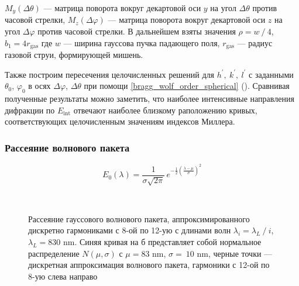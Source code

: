  $M_y(\Delta \theta)$ --- матрица поворота вокруг декартовой оси $y$ на угол $\Delta\theta$ против часовой стрелки, $M_z(\Delta\varphi)$ --- матрица поворота вокруг декартовой оси $z$ на угол $\Delta\varphi$ против часовой стрелки. В дальнейшем взяты значения $\rho = w\:/\:4$, $b_1 = 4r_{\textrm{gas}}$ где $w$ --- ширина гауссова пучка падающего поля, $r_{\textrm{gas}}$ --- радиус газовой струи, формирующей мишень.

Также построим пересечения целочисленных решений для $h^\prime,\:k^\prime,\:l^\prime$ с заданными $\theta_0$, $\varphi_0$ в осях $\Delta \varphi$, $\Delta \theta$ при помощи \autoref{bragg_wolf_order_spherical} (). Сравнивая полученные результаты можно заметить, что наиболее интенсивные направления дифракции по $E_{\textrm{int}}$ отвечают наиболее близкому раположению кривых, соответствующих целочисленным значениям индексов Миллера. 




\subsubsection{Рассеяние волнового пакета}

    \begin{equation}
        E_0 \left( \lambda \right) = \frac{1}{\sigma\sqrt{2\pi}}\,e^{-\frac{1}{2}{\left(\frac{\lambda - \mu}{\sigma}\right)}^2}
    \end{equation}

    \begin{figure}[ht]
        \hfil
        \\
        \caption{Рассеяние гауссового волнового пакета, аппроксимированного дискретно гармониками с 8-ой по 12-ую с длинами волн $\lambda_{i} = \lambda_{L}\:/\:i$, $\lambda_{L} = 830$ nm. Синяя кривая на б представляет собой нормальное распределение $N(\mu, \sigma)$ с $\mu = 83$ nm, $\sigma =~10$ nm, черные точки --- дискретная аппроксимация волнового пакета, гармоники с 12-ой по 8-ую слева направо}\label{wavepacket1:image}
    \end{figure}


